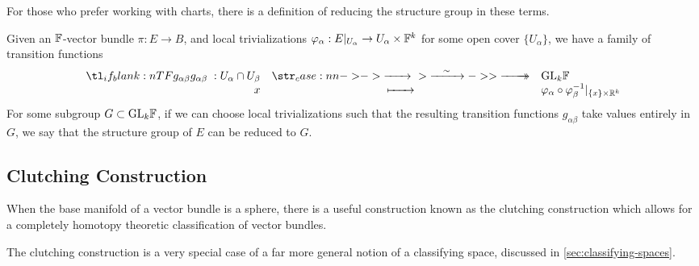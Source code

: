\begin{remark}
	For those who prefer working with charts, there is a definition of reducing the structure group in these terms.

	Given an $\mathbb{F}$-vector bundle $\pi : E \to B$, and local trivializations $\varphi_\alpha : E|_{U_\alpha} \to U_{\alpha}\times \mathbb{F}^k$ for some open cover $\{U_\alpha\}$, we have a family of transition functions
	\[
		\lkxfunc{g_{\alpha\beta}}{U_\alpha\cap U_\beta}{\GL_k \F}{x}{\varphi_\alpha\circ \varphi_{\beta}^{-1}|_{\{x\}\times \R^k}}
	\]
	For some subgroup $G\subset \mathrm{GL}_k\mathbb{F}$, if we can choose local trivializations such that the resulting transition functions $g_{\alpha\beta}$ take values entirely in $G$, we say that the structure group of $E$ can be reduced to $G$. 
\end{remark}

\begin{remark}
\end{remark}

\subsection{Clutching Construction}\label{sec:clutching-construction}

When the base manifold of a vector bundle is a sphere, there is a useful construction known as the clutching construction which allows for a completely homotopy theoretic classification of vector bundles.

\begin{remark} The clutching construction is a very special case of a far more general notion of a classifying space, discussed in \cref{sec:classifying-spaces}.
\end{remark}

